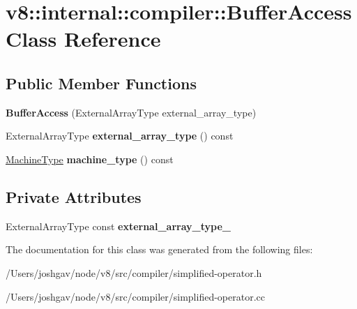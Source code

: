 \hypertarget{classv8_1_1internal_1_1compiler_1_1_buffer_access}{}\section{v8\+:\+:internal\+:\+:compiler\+:\+:Buffer\+Access Class Reference}
\label{classv8_1_1internal_1_1compiler_1_1_buffer_access}
\subsection*{Public Member Functions}
\begin{DoxyCompactItemize}
\item 
{\bfseries Buffer\+Access} (External\+Array\+Type external\+\_\+array\+\_\+type)\hypertarget{classv8_1_1internal_1_1compiler_1_1_buffer_access_a06236df9a355e38f078934e269476933}{}\label{classv8_1_1internal_1_1compiler_1_1_buffer_access_a06236df9a355e38f078934e269476933}

\item 
External\+Array\+Type {\bfseries external\+\_\+array\+\_\+type} () const \hypertarget{classv8_1_1internal_1_1compiler_1_1_buffer_access_a469227046013cc604e1ec40c8a8faa7d}{}\label{classv8_1_1internal_1_1compiler_1_1_buffer_access_a469227046013cc604e1ec40c8a8faa7d}

\item 
\hyperlink{classv8_1_1internal_1_1_machine_type}{Machine\+Type} {\bfseries machine\+\_\+type} () const \hypertarget{classv8_1_1internal_1_1compiler_1_1_buffer_access_a05c84768e26b05fd23210cf890d56960}{}\label{classv8_1_1internal_1_1compiler_1_1_buffer_access_a05c84768e26b05fd23210cf890d56960}

\end{DoxyCompactItemize}
\subsection*{Private Attributes}
\begin{DoxyCompactItemize}
\item 
External\+Array\+Type const {\bfseries external\+\_\+array\+\_\+type\+\_\+}\hypertarget{classv8_1_1internal_1_1compiler_1_1_buffer_access_a563bad181373173aeb404706d45b8224}{}\label{classv8_1_1internal_1_1compiler_1_1_buffer_access_a563bad181373173aeb404706d45b8224}

\end{DoxyCompactItemize}


The documentation for this class was generated from the following files\+:\begin{DoxyCompactItemize}
\item 
/\+Users/joshgav/node/v8/src/compiler/simplified-\/operator.\+h\item 
/\+Users/joshgav/node/v8/src/compiler/simplified-\/operator.\+cc\end{DoxyCompactItemize}
